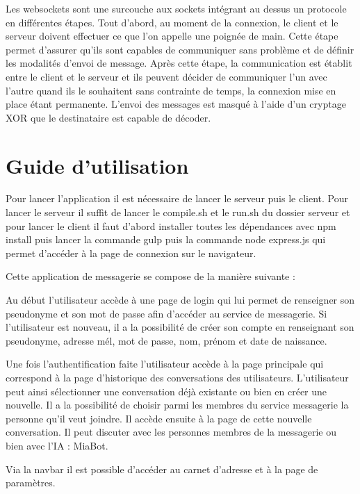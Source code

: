 \par Les websockets sont une surcouche aux sockets intégrant au dessus un protocole en différentes étapes.
Tout d'abord, au moment de la connexion, le client et le serveur doivent effectuer ce que l'on appelle une poignée de main.
Cette étape permet d'assurer qu'ils sont capables de communiquer sans problème et de définir les modalités d'envoi de message.
Après cette étape, la communication est établit entre le client et le serveur et ils peuvent décider de communiquer l'un avec l'autre 
quand ils le souhaitent sans contrainte de temps, la connexion mise en place étant permanente. 
L'envoi des messages est masqué à l'aide d'un cryptage XOR que le destinataire est capable de décoder.

\section{Guide d'utilisation}

\par Pour lancer l'application il est nécessaire de lancer le serveur puis le client. Pour lancer le serveur il suffit de lancer le compile.sh et le run.sh du dossier serveur et pour lancer le client il faut d'abord installer toutes les dépendances avec npm install puis lancer la commande gulp puis la commande node express.js qui permet d'accéder à la page de connexion sur le navigateur. \\


\par Cette application de messagerie se compose de la manière suivante : \\

\par Au début l'utilisateur accède à une page de login qui lui permet de renseigner son pseudonyme et son mot de passe afin d'accéder au service de messagerie. Si l'utilisateur est nouveau, il a la possibilité de créer son compte en renseignant son pseudonyme, adresse mél, mot de passe, nom, prénom et date de naissance. 
\par Une fois l'authentification faite l'utilisateur accède à la page principale qui correspond à la page d'historique des conversations des utilisateurs. L'utilisateur peut ainsi sélectionner une conversation déjà existante ou bien en créer une nouvelle. Il a la possibilité de choisir parmi les membres du service messagerie la personne qu'il veut joindre. Il accède ensuite à la page de cette nouvelle conversation. Il peut discuter avec les personnes membres de la messagerie ou bien avec l'IA : MiaBot.
\par Via la navbar il est possible d'accéder au carnet d'adresse et à la page de paramètres. \\

